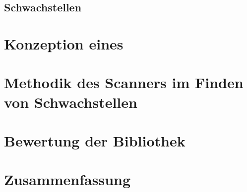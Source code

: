 \documentclass[a4paper,12pt,oneside, bibliography=totoc]
{scrbook}
\begin{document}
	\section{Schwachstellen}

	
\chapter{Konzeption eines}
\chapter{Methodik des Scanners im Finden von Schwachstellen}

\chapter{Bewertung der Bibliothek}

\chapter{Zusammenfassung}



\printbibliography


\clearpage 



\end{document}
